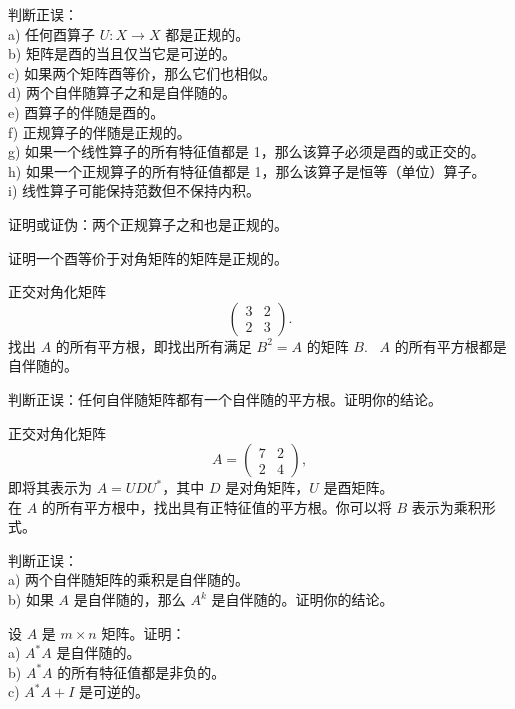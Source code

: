 \begin{problemset}
\item \label{ex:06-02-01} 判断正误：
\\
a) 任何酉算子 $U: X \to X$ 都是正规的。
\\
b) 矩阵是酉的当且仅当它是可逆的。
\\
c) 如果两个矩阵酉等价，那么它们也相似。
\\
d) 两个自伴随算子之和是自伴随的。
\\
e) 酉算子的伴随是酉的。
\\
f) 正规算子的伴随是正规的。
\\
g) 如果一个线性算子的所有特征值都是 1，那么该算子必须是酉的或正交的。
\\
h) 如果一个正规算子的所有特征值都是 1，那么该算子是恒等（单位）算子。
\\
i) 线性算子可能保持范数但不保持内积。
\item \label{ex:06-02-02} 证明或证伪：两个正规算子之和也是正规的。
\item \label{ex:06-02-03} 证明一个酉等价于对角矩阵的矩阵是正规的。
\item \label{ex:06-02-04} 正交对角化矩阵
$$\begin{pmatrix} 3 & 2 \\ 2 & 3 \end{pmatrix}.$$
找出 $A$ 的所有平方根，即找出所有满足 $B^2 = A$ 的矩阵 $B$.~
$A$ 的所有平方根都是自伴随的。
\item \label{ex:06-02-05} 判断正误：任何自伴随矩阵都有一个自伴随的平方根。证明你的结论。
\item \label{ex:06-02-06} 正交对角化矩阵 $$A = \begin{pmatrix} 7 & 2 \\ 2 & 4 \end{pmatrix},$$
即将其表示为 $A = UDU^*$，其中 $D$ 是对角矩阵，$U$ 是酉矩阵。
\\
在 $A$ 的所有平方根中，找出具有正特征值的平方根。你可以将 $B$ 表示为乘积形式。
\item \label{ex:06-02-07} 判断正误：
\\
a) 两个自伴随矩阵的乘积是自伴随的。
\\
b) 如果 $A$ 是自伴随的，那么 $A^k$ 是自伴随的。证明你的结论。
\item \label{ex:06-02-08} 设 $A$ 是 $m \times n$ 矩阵。证明：
\\
a) $A^*A$ 是自伴随的。
\\
b) $A^*A$ 的所有特征值都是非负的。
\\
c) $A^*A + I$ 是可逆的。

\end{problemset}
